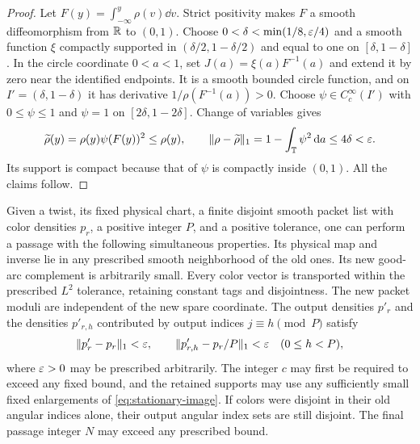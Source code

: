 \begin{proof}
Let $F(y)=\int_{-\infty}^y\rho(v)\dd v$. Strict positivity makes
$F$ a smooth diffeomorphism from $\mathbb R$ to $(0,1)$. Choose
$0<\delta<\min(1/8,\varepsilon/4)$ and a smooth function $\xi$ compactly
supported in $(\delta/2,1-\delta/2)$ and equal to one on
$[\delta,1-\delta]$. In the circle coordinate $0<a<1$, set
$J(a)=\xi(a)F^{-1}(a)$ and extend it by zero near the identified
endpoints. It is a smooth bounded circle function, and on
$I'=(\delta,1-\delta)$ it has derivative
$1/\rho(F^{-1}(a))>0$. Choose $\psi\in C_c^\infty(I')$ with
$0\le\psi\le1$ and $\psi=1$ on $[2\delta,1-2\delta]$.
Change of variables gives
\[
 \widetilde\rho(y)=\rho(y)\psi(F(y))^2\le\rho(y),\qquad
 \|\rho-\widetilde\rho\|_1
       =1-\int_\mathbb T\psi^2\,\mathrm d a\le4\delta<\varepsilon.
\]
Its support is compact because that of $\psi$ is compactly inside
$(0,1)$. All the claims follow.
\end{proof}

\begin{lemma}\label{lem:neutral}
Given a twist, its fixed physical chart, a finite disjoint smooth
packet list with color densities $p_r$, a positive integer $P$,
and a positive tolerance, one can perform a passage with the
following simultaneous properties. Its physical map and inverse
lie in any prescribed smooth neighborhood of the old ones. Its
new good-arc complement is arbitrarily small. Every color vector
is transported within the prescribed $L^2$ tolerance, retaining
constant tags and disjointness. The new packet moduli are
independent of the new spare coordinate. The output densities
$p'_r$ and the densities $p'_{r,h}$ contributed by output indices
$j\equiv h\pmod P$ satisfy
\begin{equation}\label{eq:neutral-densities}
 \|p'_r-p_r\|_1<\varepsilon,
 \qquad \|p'_{r,h}-p_r/P\|_1<\varepsilon
 \quad(0\le h<P),
\end{equation}
where $\varepsilon>0$ may be prescribed arbitrarily.
The integer $c$ may first be required to exceed any fixed bound,
and the retained supports may use any sufficiently small fixed
enlargements of \eqref{eq:stationary-image}. If colors were
disjoint in their old angular indices alone, their output angular
index sets are still disjoint. The final passage integer $N$ may
exceed any prescribed bound.
\end{lemma}

